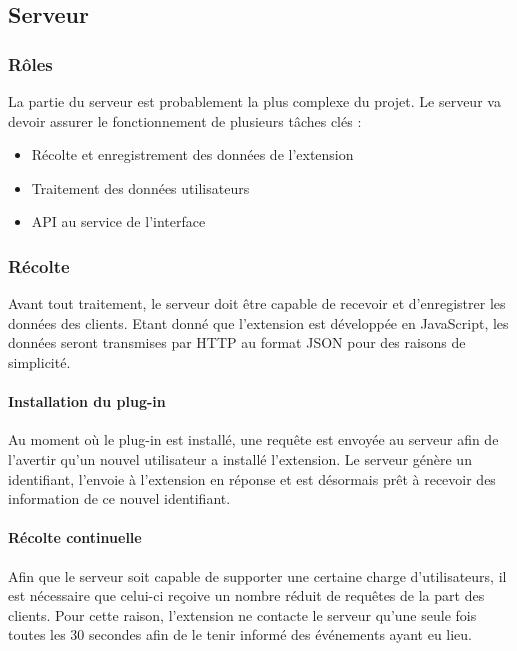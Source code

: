 	\subsection{Serveur}

		\subsubsection{Rôles}

			La partie du serveur est probablement la plus complexe du projet. Le serveur va devoir assurer le fonctionnement de plusieurs tâches clés :

			\begin{itemize}
				\item Récolte et enregistrement des données de l'extension
				\item Traitement des données utilisateurs
				\item API au service de l'interface
			\end{itemize}

		\subsubsection{Récolte}

			Avant tout traitement, le serveur doit être capable de recevoir et d'enregistrer les données des clients. Etant donné que l'extension est développée en JavaScript, les données seront transmises par HTTP au format JSON pour des raisons de simplicité.

			\paragraph{Installation du plug-in}

				Au moment où le plug-in est installé, une requête est envoyée au serveur afin de l'avertir qu'un nouvel utilisateur a installé l'extension. Le serveur génère un identifiant, l'envoie à l'extension en réponse et est désormais prêt à recevoir des information de ce nouvel identifiant.

			\paragraph{Récolte continuelle\label{d-recolte}}

				Afin que le serveur soit capable de supporter une certaine charge d'utilisateurs, il est nécessaire que celui-ci reçoive un nombre réduit de requêtes de la part des clients. Pour cette raison, l'extension ne contacte le serveur qu'une seule fois toutes les 30 secondes afin de le tenir informé des événements ayant eu lieu.

